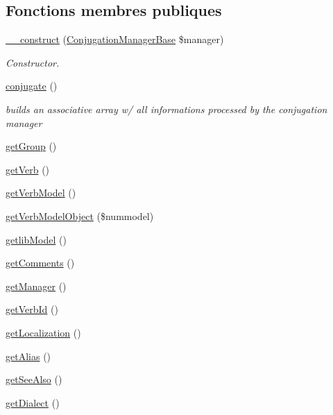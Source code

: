 \subsection*{Fonctions membres publiques}
\begin{DoxyCompactItemize}
\item 
\hyperlink{classConjugationBase_aff646e04e878c9dd1473de4619fe1bcc}{\+\_\+\+\_\+construct} (\hyperlink{classConjugationManagerBase}{Conjugation\+Manager\+Base} \$manager)
\begin{DoxyCompactList}\small\item\em Constructor. \end{DoxyCompactList}\item 
\hyperlink{classConjugationBase_a8137cfd9e8f57dafedd5cc724d57b9e6}{conjugate} ()
\begin{DoxyCompactList}\small\item\em builds an associative array w/ all informations processed by the conjugation manager \end{DoxyCompactList}\item 
\hyperlink{classConjugationBase_aa88c93007f333b916a6a51819e50e8ae}{get\+Group} ()
\item 
\hyperlink{classConjugationBase_a732cbfda6f4c28efeec68fc85aa9b65a}{get\+Verb} ()
\item 
\hyperlink{classConjugationBase_aaa7ecb3341682d48f2d2b42810de2ac2}{get\+Verb\+Model} ()
\item 
\hyperlink{classConjugationBase_a31a6fb3f63b144c6d9f0e9a27d3d28cc}{get\+Verb\+Model\+Object} (\$nummodel)
\item 
\hyperlink{classConjugationBase_a52db22137154c2fd7a8487406b959652}{getlib\+Model} ()
\item 
\hyperlink{classConjugationBase_ac381d5a6d6411aba279cb56e8505bb30}{get\+Comments} ()
\item 
\hyperlink{classConjugationBase_aab285eff4995c059a3aa0abec778a390}{get\+Manager} ()
\item 
\hyperlink{classConjugationBase_a918aff5acf4210cf363a13cf39e2430d}{get\+Verb\+Id} ()
\item 
\hyperlink{classConjugationBase_a27cc8f5f2a3b502e48c22a5b547181ac}{get\+Localization} ()
\item 
\hyperlink{classConjugationBase_ac8266b933fde0f494a7933c4d2fe0590}{get\+Alias} ()
\item 
\hyperlink{classConjugationBase_a76d7179c150a4e32fb410d5af9bc388c}{get\+See\+Also} ()
\item 
\hyperlink{classConjugationBase_a5010621a363fcfe26e5d23ade06d2c41}{get\+Dialect} ()

\end{DoxyCompactItemize}
